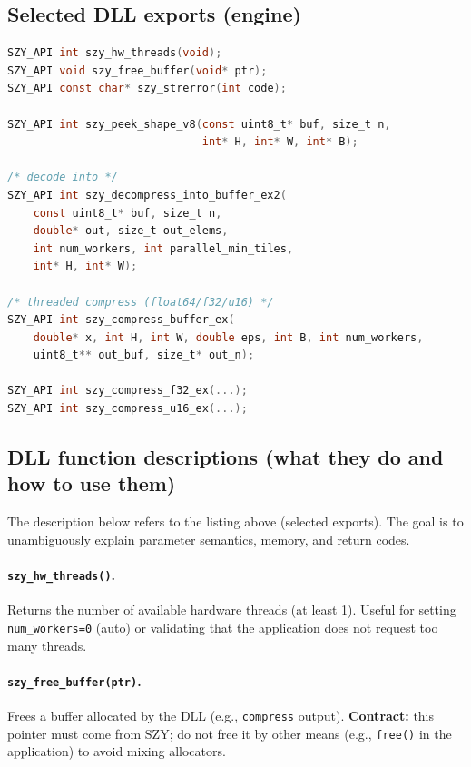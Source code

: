 \documentclass[11pt,a4paper]{article}
\begin{document}
\subsection{Selected DLL exports (engine)}
\begin{lstlisting}[style=cstyle,language=C,caption={Selected DLL functions (include/szy\_dll.h)}]
SZY_API int szy_hw_threads(void);
SZY_API void szy_free_buffer(void* ptr);
SZY_API const char* szy_strerror(int code);

SZY_API int szy_peek_shape_v8(const uint8_t* buf, size_t n,
                              int* H, int* W, int* B);

/* decode into */
SZY_API int szy_decompress_into_buffer_ex2(
    const uint8_t* buf, size_t n,
    double* out, size_t out_elems,
    int num_workers, int parallel_min_tiles,
    int* H, int* W);

/* threaded compress (float64/f32/u16) */
SZY_API int szy_compress_buffer_ex(
    double* x, int H, int W, double eps, int B, int num_workers,
    uint8_t** out_buf, size_t* out_n);

SZY_API int szy_compress_f32_ex(...);
SZY_API int szy_compress_u16_ex(...);
\end{lstlisting}

\subsection{DLL function descriptions (what they do and how to use them)}
The description below refers to the listing above (selected exports). The goal is to unambiguously explain parameter semantics, memory, and return codes.

\paragraph{\texttt{szy\_hw\_threads()}.}
Returns the number of available hardware threads (at least 1). Useful for setting \texttt{num\_workers=0} (auto) or validating that the application does not request too many threads.

\paragraph{\texttt{szy\_free\_buffer(ptr)}.}
Frees a buffer allocated by the DLL (e.g., \texttt{compress} output). \textbf{Contract:} this pointer must come from SZY; do not free it by other means (e.g., \texttt{free()} in the application) to avoid mixing allocators.
\end{document}
